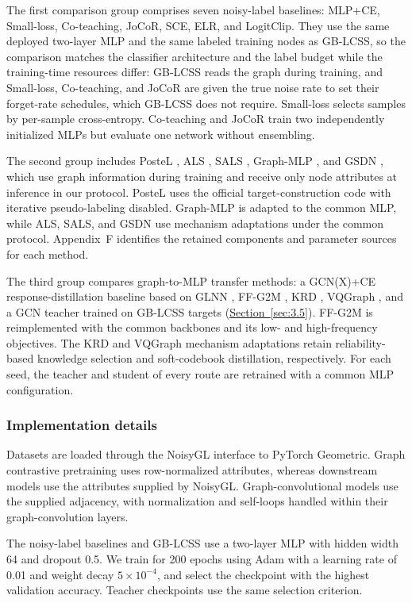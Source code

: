 \documentclass[10pt,letterpaper,nopreprintline]{elsarticle}
\theoremstyle{plain}
\begin{document}
The first comparison group comprises seven noisy-label baselines: MLP+CE, Small-loss, Co-teaching, JoCoR, SCE, ELR, and LogitClip. They use the same deployed two-layer MLP and the same labeled training nodes as GB-LCSS, so the comparison matches the classifier architecture and the label budget while the training-time resources differ: GB-LCSS reads the graph during training, and Small-loss, Co-teaching, and JoCoR are given the true noise rate to set their forget-rate schedules, which GB-LCSS does not require. Small-loss selects samples by per-sample cross-entropy. Co-teaching and JoCoR train two independently initialized MLPs but evaluate one network without ensembling.

The second group includes PosteL \cite{ref54}, ALS \cite{ref55}, SALS \cite{ref56}, Graph-MLP \cite{ref3}, and GSDN \cite{ref40}, which use graph information during training and receive only node attributes at inference in our protocol. PosteL uses the official target-construction code with iterative pseudo-labeling disabled. Graph-MLP is adapted to the common MLP, while ALS, SALS, and GSDN use mechanism adaptations under the common protocol. Appendix~F identifies the retained components and parameter sources for each method.

The third group compares graph-to-MLP transfer methods: a GCN(X)+CE response-distillation baseline based on GLNN \cite{ref4}, FF-G2M \cite{ref45}, KRD \cite{ref46}, VQGraph \cite{ref47}, and a GCN teacher trained on GB-LCSS targets (\hyperref[sec:3.5]{Section~\ref*{sec:3.5}}). FF-G2M is reimplemented with the common backbones and its low- and high-frequency objectives. The KRD and VQGraph mechanism adaptations retain reliability-based knowledge selection and soft-codebook distillation, respectively. For each seed, the teacher and student of every route are retrained with a common MLP configuration.

\subsubsection{Implementation details}\label{sec:4.1.4}

Datasets are loaded through the NoisyGL interface to PyTorch Geometric. Graph contrastive pretraining uses row-normalized attributes, whereas downstream models use the attributes supplied by NoisyGL. Graph-convolutional models use the supplied adjacency, with normalization and self-loops handled within their graph-convolution layers.

The noisy-label baselines and GB-LCSS use a two-layer MLP with hidden width 64 and dropout 0.5. We train for 200 epochs using Adam with a learning rate of 0.01 and weight decay \(5 \times 10^{- 4}\), and select the checkpoint with the highest validation accuracy. Teacher checkpoints use the same selection criterion.
\end{document}
